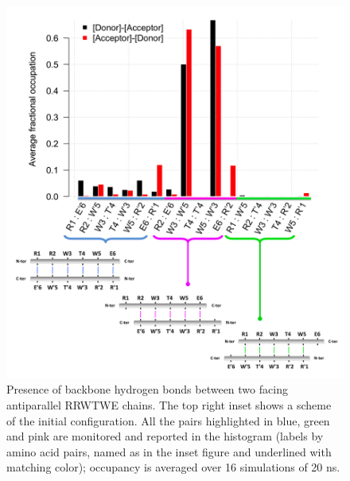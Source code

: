 \begin{figure}
\centering
\includegraphics[width=0.9\linewidth]{3results_capsule/pics/merged_figures_beta_sheet2}
\caption[Hydrogen bonds in a RRWTWE $\beta$-sheet]{Presence of backbone hydrogen bonds between two facing antiparallel RRWTWE chains. The top right inset shows a scheme of the initial configuration. All the pairs highlighted in blue, green and pink are monitored and reported in the histogram (labels by amino acid pairs, named as in the inset figure and underlined with matching color); occupancy is averaged over 16 simulations of 20 ns.}
\label{fig:hb_beta_SIhere_hb}
\end{figure}

